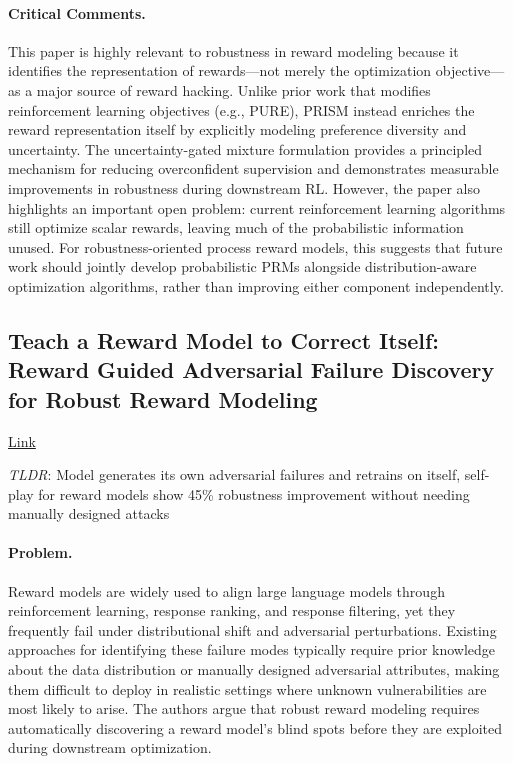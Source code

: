 \documentclass[11pt]{article}
\begin{document}
\paragraph{Critical Comments.}
This paper is highly relevant to robustness in reward modeling because it identifies the representation of rewards—not merely the optimization objective—as a major source of reward hacking. Unlike prior work that modifies reinforcement learning objectives (e.g., PURE), PRISM instead enriches the reward representation itself by explicitly modeling preference diversity and uncertainty. The uncertainty-gated mixture formulation provides a principled mechanism for reducing overconfident supervision and demonstrates measurable improvements in robustness during downstream RL. However, the paper also highlights an important open problem: current reinforcement learning algorithms still optimize scalar rewards, leaving much of the probabilistic information unused. For robustness-oriented process reward models, this suggests that future work should jointly develop probabilistic PRMs alongside distribution-aware optimization algorithms, rather than improving either component independently.


\subsection{Teach a Reward Model to Correct Itself: Reward Guided Adversarial Failure Discovery for Robust Reward Modeling}

\href{https://arxiv.org/abs/2507.06419}{Link}

\emph{TLDR}: Model generates its own adversarial failures and retrains on itself, self-play for reward models show 45\% robustness improvement without needing manually designed attacks

\paragraph{Problem.}
Reward models are widely used to align large language models through reinforcement learning, response ranking, and response filtering, yet they frequently fail under distributional shift and adversarial perturbations. Existing approaches for identifying these failure modes typically require prior knowledge about the data distribution or manually designed adversarial attributes, making them difficult to deploy in realistic settings where unknown vulnerabilities are most likely to arise. The authors argue that robust reward modeling requires automatically discovering a reward model's blind spots before they are exploited during downstream optimization.
\end{document}
